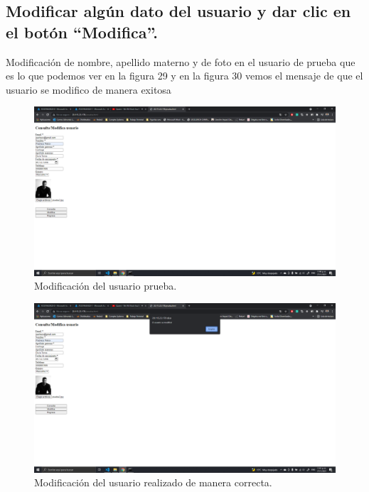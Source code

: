 \documentclass[11pt]{article}
\begin{document}
		\subsection{Modificar algún dato del usuario y dar clic en el botón ``Modifica''.}
		Modificación de nombre, apellido materno y de foto en el usuario de prueba que es lo que podemos ver en la figura 29 y en la figura 30 vemos el mensaje de que el usuario se modifico de manera exitosa
		\begin{figure}[H]
			\centering
			\includegraphics[scale=0.34]{resources/p9.5.png}
			\caption{Modificación del usuario prueba.}\label{fig:picture}
		\end{figure}
		\begin{figure}[H]
			\centering
			\includegraphics[scale=0.34]{resources/p9.5.1.png}
			\caption{Modificación del usuario realizado de manera correcta.}\label{fig:picture}
		\end{figure}
\end{document}
